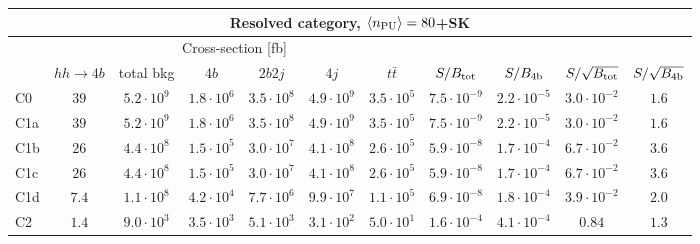 \begin{tabular}{|l|cc|cccc|cccc|}
  \hline
\multicolumn{11}{|c|}{Resolved category, $\left\langle n_{\rm PU}\right\rangle=80$+SK}\\
\hline
&  \multicolumn{6}{c|}{Cross-section [fb]} &  &  & &  \\
   &  $hh\to 4b$ &  total bkg  &   $4b$    &  $2b2j$   &   $4j$    &
$t\bar{t}$ &
$S/B_{\rm tot}$ & $S/B_{\rm 4b}$ & $S/\sqrt{B_{\rm tot}}$ & $S/\sqrt{B_{\rm 4b}}$ \\
  \hline
  \hline
  C0    &    $39 $ &   $5.2 \cdot 10^9$   & $1.8 \cdot 10^6$ & $3.5 \cdot 10^8$ & $4.9 \cdot 10^9$ & $3.5 \cdot 10^5$     &  $ 7.5 \cdot 10^{-9}$   & $2.2 \cdot 10^{-5}$  &
  $3.0 \cdot 10^{-2}$   & $1.6 $  \\
 C1a   &    $39$&   $5.2 \cdot 10^9$   & $1.8 \cdot 10^6$ & $3.5 \cdot 10^8$ & $4.9 \cdot 10^9$ & $3.5 \cdot 10^5$     &  $7.5 \cdot 10^{-9}$   & $2.2 \cdot 10^{-5}$   &   $3.0 \cdot 10^{-2}$   & $1.6  $ \\
 C1b   &  $26$ &   $4.4 \cdot 10^8$   & $1.5 \cdot 10^5$ & $3.0 \cdot 10^7$ & $4.1 \cdot 10^8$ & $2.6 \cdot 10^5$     &  $ 5.9 \cdot 10^{-8}$   & $1.7 \cdot 10^{-4}$  &    $6.7 \cdot 10^{-2}$   & $3.6  $\\
 C1c   &   $26$  &   $4.4 \cdot 10^8 $  & $1.5 \cdot 10^5$ & $3.0 \cdot 10^7$ & $4.1 \cdot 10^8$ & $2.6 \cdot 10^5$     &    $5.9 \cdot 10^{-8}$   & $1.7 \cdot 10^{-4}$  &     $ 6.7 \cdot 10^{-2}$   &$ 3.6 $ \\
 C1d   &   $7.4$ &   $1.1 \cdot 10^8$   & $4.2 \cdot 10^4$ & $7.7 \cdot 10^6$ & $9.9 \cdot 10^7$ & $1.1 \cdot 10^5$     &   $6.9 \cdot 10^{-8}$   & $1.8 \cdot 10^{-4}$   &   $3.9 \cdot 10^{-2}$   & $2.0 $ \\
 C2    &  $1.4$ &   $9.0 \cdot 10^3$   & $3.5 \cdot 10^3$ & $5.1 \cdot 10^3$ & $3.1 \cdot 10^2$ & $5.0 \cdot 10^1$     &    $1.6 \cdot 10^{-4}$   & $4.1 \cdot 10^{-4}$  &   $0.84$   &
 $1.3 $ \\
\hline
\end{tabular}
  $\,$ \\
  \vspace{0.5cm}
